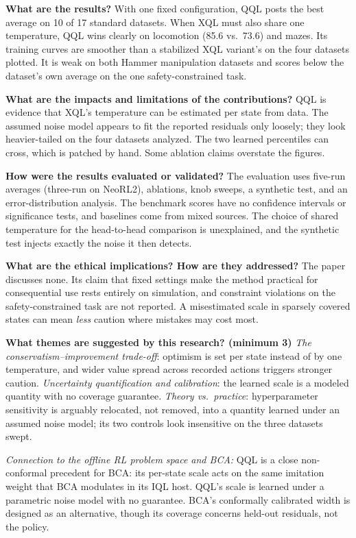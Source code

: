 \documentclass[11pt]{article}
\newcommand{\q}[2]{\item \textbf{#1} #2}
\newcommand{\tiein}[1]{\par\smallskip\noindent\emph{Connection to the offline RL problem space and BCA:} #1\par\medskip}
\begin{document}
\begin{qna}
\q{What are the results?}
With one fixed configuration, QQL posts the best average on 10 of 17 standard datasets. When XQL must also share one temperature, QQL wins clearly on locomotion (85.6 vs.\ 73.6) and mazes. Its training curves are smoother than a stabilized XQL variant's on the four datasets plotted. It is weak on both Hammer manipulation datasets and scores below the dataset's own average on the one safety-constrained task.

\q{What are the impacts and limitations of the contributions?}
QQL is evidence that XQL's temperature can be estimated per state from data. The assumed noise model appears to fit the reported residuals only loosely; they look heavier-tailed on the four datasets analyzed. The two learned percentiles can cross, which is patched by hand. Some ablation claims overstate the figures.

\q{How were the results evaluated or validated?}
The evaluation uses five-run averages (three-run on NeoRL2), ablations, knob sweeps, a synthetic test, and an error-distribution analysis. The benchmark scores have no confidence intervals or significance tests, and baselines come from mixed sources. The choice of shared temperature for the head-to-head comparison is unexplained, and the synthetic test injects exactly the noise it then detects.

\q{What are the ethical implications? How are they addressed?}
The paper discusses none. Its claim that fixed settings make the method practical for consequential use rests entirely on simulation, and constraint violations on the safety-constrained task are not reported. A misestimated scale in sparsely covered states can mean \emph{less} caution where mistakes may cost most.

\q{What themes are suggested by this research? (minimum 3)}
\emph{The conservatism--improvement trade-off}: optimism is set per state instead of by one temperature, and wider value spread across recorded actions triggers stronger caution. \emph{Uncertainty quantification and calibration}: the learned scale is a modeled quantity with no coverage guarantee. \emph{Theory vs.\ practice}: hyperparameter sensitivity is arguably relocated, not removed, into a quantity learned under an assumed noise model; its two controls look insensitive on the three datasets swept.

\end{qna}
\tiein{QQL is a close non-conformal precedent for BCA: its per-state scale acts on the same imitation weight that BCA modulates in its IQL host. QQL's scale is learned under a parametric noise model with no guarantee. BCA's conformally calibrated width is designed as an alternative, though its coverage concerns held-out residuals, not the policy.}
\end{document}
